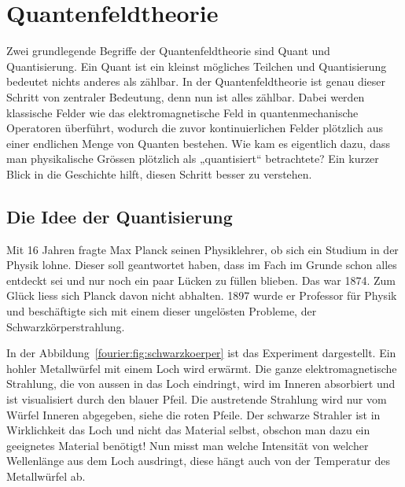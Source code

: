 %
%
%
%
\section{Quantenfeldtheorie\label{fourier:section:quantenfeldtheorie}}
Zwei grundlegende Begriffe der Quantenfeldtheorie sind Quant und Quantisierung. 
Ein Quant ist ein kleinst mögliches Teilchen und Quantisierung bedeutet nichts anderes als zählbar. 
In der Quantenfeldtheorie ist genau dieser Schritt von zentraler Bedeutung, denn nun ist alles zählbar. 
Dabei werden klassische Felder wie das elektromagnetische Feld in quantenmechanische Operatoren überführt, wodurch die zuvor kontinuierlichen Felder plötzlich aus einer endlichen Menge von Quanten bestehen.
Wie kam es eigentlich dazu, dass man physikalische Grössen plötzlich als „quantisiert“ betrachtete?
Ein kurzer Blick in die Geschichte hilft, diesen Schritt besser zu verstehen.

\subsection{Die Idee der Quantisierung\label{fourier:subsection:DieIdeeDerQuantisierung}}
	Mit 16 Jahren fragte Max Planck seinen Physiklehrer, ob sich ein Studium in der Physik lohne. 
	Dieser soll geantwortet haben, dass im Fach im Grunde schon alles entdeckt sei und nur noch ein paar Lücken zu füllen blieben.
	Das war 1874.
	Zum Glück liess sich Planck davon nicht abhalten.
	1897 wurde er Professor für Physik und beschäftigte sich mit einem dieser ungelösten Probleme, der Schwarzkörperstrahlung. 
	
	
	In der Abbildung~\ref{fourier:fig:schwarzkoerper} ist das Experiment dargestellt. Ein hohler Metallwürfel mit einem Loch wird erwärmt. 
	Die ganze elektromagnetische Strahlung, die von aussen in das Loch eindringt, wird im Inneren absorbiert und ist visualisiert durch den blauer Pfeil. 
	Die austretende Strahlung wird nur vom Würfel Inneren abgegeben, siehe die roten Pfeile. 
	Der schwarze Strahler ist in Wirklichkeit das Loch und nicht das Material selbst, obschon man dazu ein geeignetes Material benötigt! Nun misst man welche Intensität von welcher Wellenlänge aus dem Loch ausdringt, diese hängt auch von der Temperatur des Metallwürfel ab. 
	
